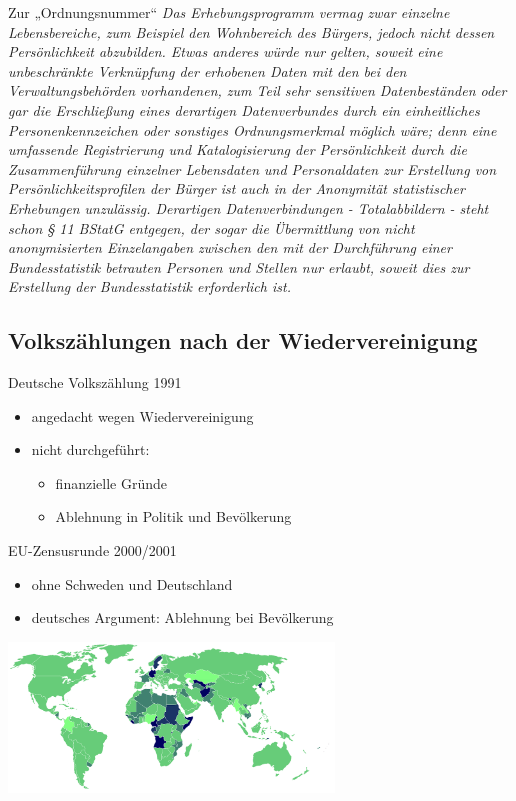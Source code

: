 \documentclass[ignorenonframetext,ucs]{beamer}
\begin{document}
\begin{frame}{Zur „Ordnungsnummer“}
\emph{\scriptsize Das Erhebungsprogramm vermag zwar einzelne Lebensbereiche, zum Beispiel den Wohnbereich des Bürgers, jedoch nicht dessen Persönlichkeit abzubilden. Etwas anderes würde nur gelten, soweit eine unbeschränkte Verknüpfung der erhobenen Daten mit den bei den Verwaltungsbehörden vorhandenen, zum Teil sehr sensitiven Datenbeständen oder gar die Erschließung eines derartigen Datenverbundes durch ein einheitliches Personenkennzeichen oder sonstiges Ordnungsmerkmal möglich wäre; denn eine umfassende Registrierung und Katalogisierung der Persönlichkeit durch die Zusammenführung einzelner Lebensdaten und Personaldaten zur Erstellung von Persönlichkeitsprofilen der Bürger ist auch in der Anonymität statistischer Erhebungen unzulässig. Derartigen Datenverbindungen - Totalabbildern - steht schon § 11 BStatG entgegen, der sogar die Übermittlung von nicht anonymisierten Einzelangaben zwischen den mit der Durchführung einer Bundesstatistik betrauten Personen und Stellen nur erlaubt, soweit dies zur Erstellung der Bundesstatistik erforderlich ist.}
\end{frame}

\subsection{Volkszählungen nach der Wiedervereinigung}

\begin{frame}{Deutsche Volkszählung 1991}\begin{itemize}
\item angedacht wegen Wiedervereinigung
\item nicht durchgeführt:\begin{itemize}
	\item finanzielle Gründe
	\item Ablehnung in Politik und Bevölkerung
\end{itemize}
\end{itemize}\end{frame}

\begin{frame}{EU-Zensusrunde 2000/2001}\begin{itemize}
\item ohne Schweden und Deutschland
\item deutsches Argument: Ablehnung bei Bevölkerung
\end{itemize}
\includegraphics[height=4cm]{most-recent-census.png}
\end{frame}
\end{document}
